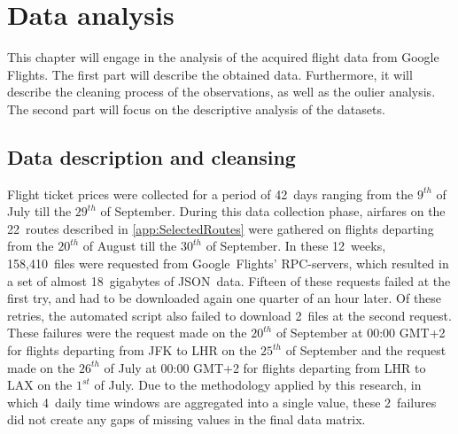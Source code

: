 \chapter{Data analysis}
\label{chap:DataAnalysis}
This chapter will engage in the analysis of the acquired flight data from Google Flights. The first part will describe the obtained data. Furthermore, it will describe the cleaning process of the observations, as well as the oulier analysis. The second part will focus on the descriptive analysis of the datasets.

\section{Data description and cleansing}
Flight ticket prices were collected for a period of 42~days ranging from the $9^{th}$ of July till the $29^{th}$ of September. During this data collection phase, airfares on the 22~routes described in \autoref{app:SelectedRoutes} were gathered on flights departing from the $20^{th}$ of August till the $30^{th}$ of September. In these 12~weeks, 158,410~files were requested from Google~Flights' RPC-servers, which resulted in a set of almost 18~gigabytes of JSON~data. Fifteen of these requests failed at the first try, and had to be downloaded again one quarter of an hour later. Of these retries, the automated script also failed to download 2~files at the second request. These failures were the request made on the $20^{th}$ of September at 00:00 GMT+2 for flights departing from JFK to LHR on the $25^{th}$ of September and the request made on the $26^{th}$ of July at 00:00 GMT+2 for flights departing from LHR to LAX on the $1^{st}$ of July. Due to the methodology applied by this research, in which 4~daily time windows are aggregated into a single value, these 2~failures did not create any gaps of missing values in the final data matrix.

